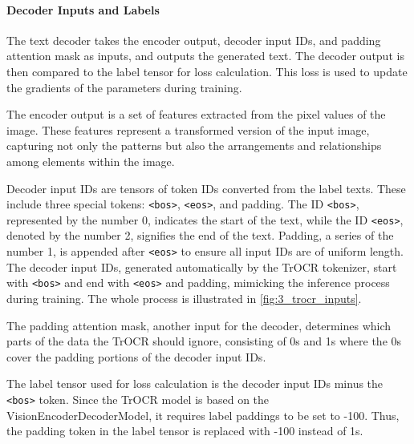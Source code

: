 \paragraph*{Decoder Inputs and Labels}
\label{par:3_decoder_inputs_and_labels}
The text decoder takes the encoder output, decoder input IDs, and padding attention mask as inputs, and outputs the generated text. The decoder output is then compared to the label tensor for loss calculation. This loss is used to update the gradients of the parameters during training.

The encoder output is a set of features extracted from the pixel values of the image. These features represent a transformed version of the input image, capturing not only the patterns but also the arrangements and relationships among elements within the image.

Decoder input IDs are tensors of token IDs converted from the label texts. These include three special tokens: \texttt{<bos>}, \texttt{<eos>}, and padding. The ID \texttt{<bos>}, represented by the number 0, indicates the start of the text, while the ID \texttt{<eos>}, denoted by the number 2, signifies the end of the text. Padding, a series of the number 1, is appended after \texttt{<eos>} to ensure all input IDs are of uniform length. The decoder input IDs, generated automatically by the TrOCR tokenizer, start with \texttt{<bos>} and end with \texttt{<eos>} and padding, mimicking the inference process during training. The whole process is illustrated in \autoref{fig:3_trocr_inputs}.

The padding attention mask, another input for the decoder, determines which parts of the data the TrOCR should ignore, consisting of 0s and 1s where the 0s cover the padding portions of the decoder input IDs.

The label tensor used for loss calculation is the decoder input IDs minus the \texttt{<bos>} token. Since the TrOCR model is based on the VisionEncoderDecoderModel, it requires label paddings to be set to -100. Thus, the padding token in the label tensor is replaced with -100 instead of 1s.

